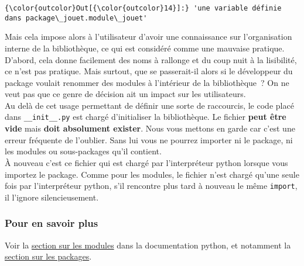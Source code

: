 \begin{Verbatim}[commandchars=\\\{\}]
{\color{outcolor}Out[{\color{outcolor}14}]:} 'une variable définie dans package\_jouet.module\_jouet'
\end{Verbatim}
            
    Mais cela impose alors à l'utilisateur d'avoir une connaissance sur
l'organisation interne de la bibliothèque, ce qui est considéré comme
une mauvaise pratique.\\

D'abord, cela donne facilement des noms à rallonge et du coup nuit à la
lisibilité, ce n'est pas pratique. Mais surtout, que se passerait-il
alors si le développeur du package voulait renommer des modules à
l'intérieur de la bibliothèque~? On ne veut pas que ce genre de décision
ait un impact sur les utilisateurs.\\

    Au delà de cet usage permettant de définir une sorte de raccourcis, le
code placé dans \texttt{\_\_init\_\_.py} est chargé d'initialiser la
bibliothèque. Le fichier \textbf{peut être vide} mais \textbf{doit
absolument exister}. Nous vous mettons en garde car c'est une erreur
fréquente de l'oublier. Sans lui vous ne pourrez importer ni le package,
ni les modules ou sous-packages qu'il contient.\\

    À nouveau c'est ce fichier qui est chargé par l'interpréteur python
lorsque vous importez le package. Comme pour les modules, le fichier
n'est chargé qu'une seule fois par l'interpréteur python, s'il rencontre
plus tard à nouveau le même \texttt{import}, il l'ignore
silencieusement.

    \hypertarget{pour-en-savoir-plus}{%
\subsubsection{Pour en savoir plus}\label{pour-en-savoir-plus}}

    Voir la \href{https://docs.python.org/3/tutorial/modules.html}{section
sur les modules} dans la documentation python, et notamment la
\href{https://docs.python.org/3/tutorial/modules.html\#packages}{section
sur les packages}.